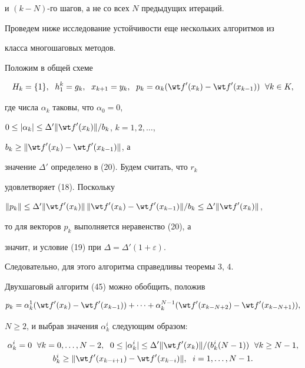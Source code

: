 и $(k-N)$-го шагов, а не со всех $N$ предыдущих итераций.


Проведем ниже исследование устойчивости еще нескольких алгоритмов из


класса многошаговых методов.





Положим в общей схеме


\begin{equation}


H_k=\{1\},\ \; h_1^k=g_k,\ \; x_{k+1}=y_k,\ \; p_k=\alpha_k({\wt f}'(x_k)-


{\wt f}'(x_{k-1}))\ \; \forall k\in K,


\end{equation}


где числа $\alpha_k$ таковы, что $\alpha_0=0$,


$0\le |{\alpha_k} |\le {\Delta}'\|{{\wt f}'(x_k)}\|/b_k$, $k=1,2,\dotsc$,


$b_k\ge\|{{\wt f}'(x_k)-{\wt f}'(x_{k-1})}\|$, а


значение ${\Delta}'$ определено в (20). Будем считать, что $r_k$


удовлетворяет (18). Поскольку


$\|{p_k}\|\le {\Delta}'\|{{\wt f}'(x_k)}\|\,\|{{\wt f}'(x_k)-{\wt


f}'(x_{k-1})}\|/b_k\le {\Delta}'\|{{\wt f}'(x_k)}\|$,


то для векторов $p_k$ выполняется неравенство (20), а


значит, и условие (19) при $\Delta ={\Delta}'(1+\varepsilon)$.


Следовательно, для этого алгоритма справедливы теоремы 3, 4.





Двухшаговый алгоритм (45) можно обобщить, положив


$$


p_k=\alpha_k^1({\wt f}'(x_k)-{\wt f}'(x_{k-1}))+\dotsb


+\alpha_k^{N-1}({\wt f}'(x_{k-N+2})-{\wt f}'(x_{k-N+1})),


$$


$N\ge 2$, и выбрав значения $\alpha_k^i$ следующим образом:


\begin{gather*}


\alpha_k^i=0\ \;\forall k=0,\dotsc,N-2,


\ \; 0\le |{\alpha_k^i} |\le {\Delta}'


\|{{\wt f}'(x_k)}\|/(b_k^i(N-1))\ \; \forall k\ge N-1,\\


b_k^i\ge\|{{\wt f}'(x_{k-i+1})-{\wt f}'(x_{k-i})}\|,\ \; i=1,\dotsc,N-1.


\end{gather*}


